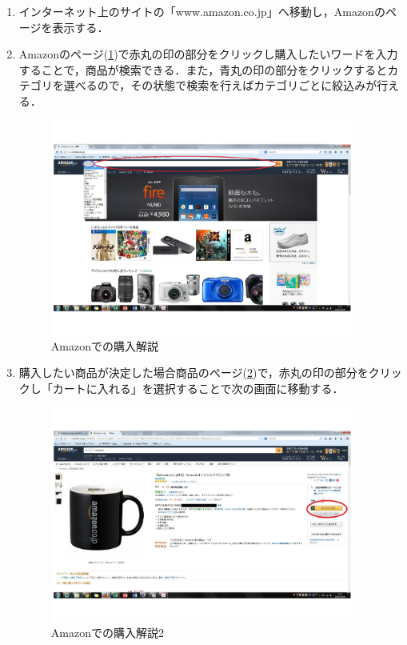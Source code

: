 \begin{enumerate}
 \item インターネット上のサイトの「www.amazon.co.jp」へ移動し，Amazonのページを表示する．
 \item Amazonのページ(\ref{Amazonでの購入解説})で赤丸の印の部分をクリックし購入したいワードを入力することで，商品が検索できる．また，青丸の印の部分をクリックするとカテゴリを選べるので，その状態で検索を行えばカテゴリごとに絞込みが行える．



\begin{figure}[htb]
\centering
\includegraphics[width=10cm]{kensakuhouhou.pdf}
\caption{Amazonでの購入解説}
\label{Amazonでの購入解説}
\end{figure}

 \item 購入したい商品が決定した場合商品のページ(\ref{Amazonでの購入解説2})で，赤丸の印の部分をクリックし「カートに入れる」を選択することで次の画面に移動する．

\clearpage



\begin{figure}[htb]
\centering
\includegraphics[width=10cm]{kensakuhouhou2.pdf}
\caption{Amazonでの購入解説2}
\label{Amazonでの購入解説2}
\end{figure}





\end{enumerate}
